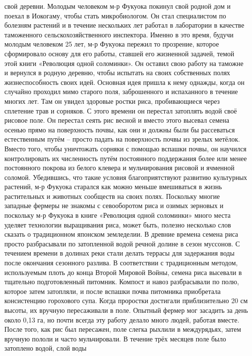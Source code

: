 \documentclass[a4paper]{book}
\begin{document}
свой деревни.
Молодым человеком м-р Фукуока покинул свой родной дом и поехал в Иокогаму, чтобы
стать микробиологом. Он стал специалистом по болезням растений и в течение нескольких
лет работал в лаборатории в качестве таможенного сельскохозяйственного инспектора.
Именно в это время, будучи молодым человеком 25 лет, м-р Фукуока пережил то прозрение,
которое сформировало основу для его работы, ставшей его жизненной задачей, темой этой
книги «Революция одной соломинки». Он оставил свою работу на таможне и вернулся в
родную деревню, чтобы испытать на своих собственных полях жизнеспособность своих
идей.
Основная идея пришла к нему однажды, когда он случайно проходил мимо старого поля,
заброшенного и испаханного в течение многих лет. Там он увидел здоровые ростки риса,
пробивающиеся через сплетение трав и сорняков. С этого времени он перестал затоплять
водой своё рисовое поле. Он перестал сеять рис весной и вместо этого высевал семена
осенью прямо на поверхность почвы, как они и должны были бы рассеваться естественным
путём – просто падать на поверхность почвы из зрелых метёлок. Вместо того, чтобы
уничтожать сорняки с помощью вспашки почвы, он научился контролировать их численность
путём постоянного поддержания более или менее постоянного покрова из белого клевера и
мульчирования рисовой и ячменной соломой. Убедившись, что такие условия
благоприятствуют развитию культурных растений, м-р Фукуока старался как можно меньше
вмешиваться в жизнь растительных и животных сообществ на своих полях.
Поскольку многие западные фермеры не знакомы с севооборотом риса и озимых
зерновых и поскольку м-р Фукуока в книге «Революция одной соломинки» много места
уделяет технологии выращивания риса, может быть, полезно несколько слов сказать о
традиционном японском земледелии.
В древние времена семена риса просто разбрасывали по затопленной водой речной
долине в сезон муссонов. С течением времени в долинах реки стали делать террасы для
задержания воды после окончания сезонного разлива. В соответствии с традиционным
методом, используемым плоть до конца Второй Мировой Войны, семена риса высевали в
тщательно подготовленный питомник. Компост и навоз разбрасывали по полю, которое
затем затопляли, и после вспашки почва питомника приобретала консистенцию горохового
супа. Когда проростки достигали приблизительно 20 см высоты, их вручную пересаживали в
поле. Опытный фермер мог засадить за день около 0,13 га, но почти всегда эту работу делало
много людей, работая вместе.
После того, как рис был пересажен, поле слегка рыхлили в междурядьях, затем вручную
пололи и часто мульчировали. В течение трёх месяцев поле было затоплено водой, слой воды
\end{document}
